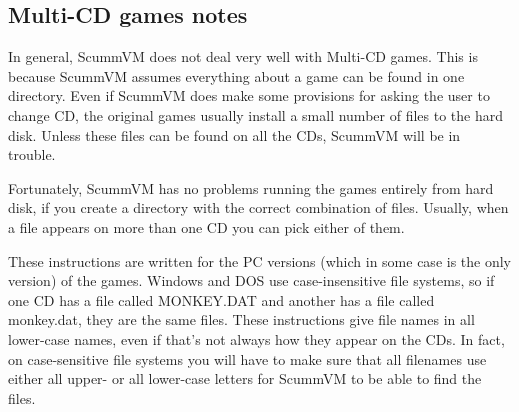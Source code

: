 \subsection{Multi-CD games notes}

In general, ScummVM does not deal very well with Multi-CD games. This is
because ScummVM assumes everything about a game can be found in one directory.
Even if ScummVM does make some provisions for asking the user to change CD, the
original games usually install a small number of files to the hard disk. Unless
these files can be found on all the CDs, ScummVM will be in trouble.

Fortunately, ScummVM has no problems running the games entirely from hard disk,
if you create a directory with the correct combination of files. Usually, when
a file appears on more than one CD you can pick either of them.

These instructions are written for the PC versions (which in some case is the
only version) of the games. Windows and DOS use case-insensitive file systems,
so if one CD has a file called MONKEY.DAT and another has a file called
monkey.dat, they are the same files. These instructions give file names in all
lower-case names, even if that's not always how they appear on the CDs. In
fact, on case-sensitive file systems you will have to make sure that all
filenames use either all upper- or all lower-case letters for ScummVM to be
able to find the files.


